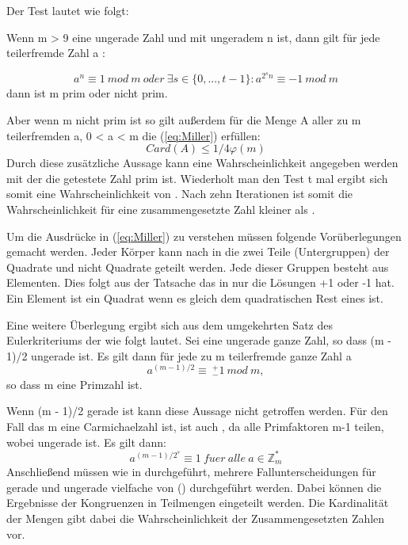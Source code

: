 		 Der Test lautet wie folgt:
		 
		 Wenn m \myin {} > 9  eine ungerade Zahl und  mit ungeradem n ist, dann gilt für jede teilerfremde Zahl a \myin {}:
		 
	 	\begin{equation} \label{eq:Miller}
			a^n \equiv 1~mod~m~oder~\exists s \in \{0,..., t - 1\} : a^{2^sn} \equiv -1~mod~m
		\end{equation}
		dann ist m prim oder nicht prim.
		
		Aber wenn m nicht prim ist so gilt außerdem für die Menge A aller zu m teilerfremden a, 0 < a < m die (\ref{eq:Miller}) erfüllen:
	 	\begin{equation} \label{eq:Miller}
		 	Card(A) \leq 1/4 \varphi(m)
	 	\end{equation}
	 	Durch diese zusätzliche Aussage kann eine Wahrscheinlichkeit angegeben werden mit der die getestete Zahl prim ist. Wiederholt man den Test t mal ergibt sich somit eine Wahrscheinlichkeit von . Nach zehn Iterationen ist somit die Wahrscheinlichkeit für eine zusammengesetzte Zahl kleiner als .
	 	
	 	Um die Ausdrücke in (\ref{eq:Miller}) zu verstehen müssen folgende Vorüberlegungen gemacht werden.
	 	Jeder Körper  kann nach \cite{Algorithmische:Zahlentheorie} in die zwei Teile (Untergruppen) der Quadrate und nicht Quadrate geteilt werden. Jede dieser Gruppen besteht aus  Elementen. Dies folgt aus der Tatsache das  in  nur die Lösungen +1 oder -1 hat. Ein Element ist ein Quadrat wenn es gleich dem quadratischen Rest eines  ist.
	 	
	 	Eine weitere Überlegung ergibt sich aus dem umgekehrten Satz des Eulerkriteriums der wie folgt lautet.
	 	Sei  eine ungerade ganze Zahl, so dass (m - 1)/2 ungerade ist.
	 	Es gilt dann für jede zu m teilerfremde ganze Zahl a
	 	\begin{equation}
		 	a^{(m-1)/2} \equiv~^+_-1~mod~m,
	 	\end{equation}
	 	so dass m eine Primzahl ist.
	 	
	 	Wenn (m - 1)/2 gerade ist kann diese Aussage nicht getroffen werden. Für den Fall das m eine Carmichaelzahl ist, ist auch  , da alle Primfaktoren m-1 teilen, wobei  ungerade ist. Es gilt dann:
 		\begin{displaymath}
	 		a^{(m-1)/2^s} \equiv1 ~fuer~alle~a \in \mathbb{Z}^*_m
 		\end{displaymath}
 		Anschließend müssen wie in \cite{Algorithmische:Zahlentheorie} durchgeführt, mehrere Fallunterscheidungen für gerade und ungerade vielfache von () durchgeführt werden. Dabei können die Ergebnisse der Kongruenzen in Teilmengen eingeteilt werden. Die Kardinalität der Mengen gibt dabei die Wahrscheinlichkeit der Zusammengesetzten Zahlen vor.
 		
